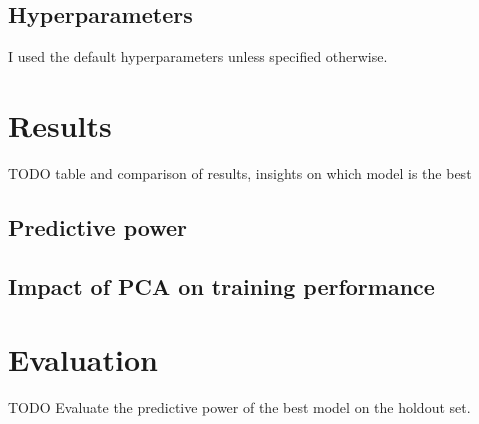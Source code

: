 \documentclass[10pt, twocolumn]{article}
\begin{document}
\subsection{Hyperparameters}
I used the default hyperparameters unless specified otherwise.

\section{Results}
TODO table and comparison of results, insights on which model is the best
\subsection{Predictive power}

\subsection{Impact of PCA on training performance}

\section{Evaluation}
TODO Evaluate the predictive power of the best model on the holdout set.


\medskip
 


\end{document}
